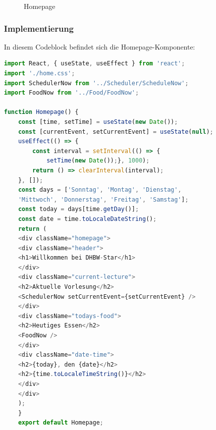 \begin{figure}[htbp]
	\centering
	\caption{Homepage}
\end{figure}
\newpage
\subsubsection{Implementierung}
In diesem Codeblock befindet sich die Homepage-Komponente:
\begin{lstlisting}[language=JavaScript,
	frame=single,           % Ein Rahmen um den Code
	framexleftmargin=15pt,  % Rahmen link von den Zahlen
	style=algoBericht,
	label={Homepage-Komponente},
	captionpos=b ,          % Caption unter den Code setzen
	caption={Homepage-Komponente}]
import React, { useState, useEffect } from 'react';
import './home.css';
import SchedulerNow from '../Scheduler/ScheduleNow';
import FoodNow from '../Food/FoodNow';

function Homepage() {
	const [time, setTime] = useState(new Date());
	const [currentEvent, setCurrentEvent] = useState(null);
	useEffect(() => {
		const interval = setInterval(() => {
			setTime(new Date());}, 1000);
		return () => clearInterval(interval);
	}, []);
	const days = ['Sonntag', 'Montag', 'Dienstag', 
	'Mittwoch', 'Donnerstag', 'Freitag', 'Samstag'];
	const today = days[time.getDay()];
	const date = time.toLocaleDateString();
	return (
	<div className="homepage">
	<div className="header">
	<h1>Willkommen bei DHBW-Star</h1>
	</div>
	<div className="current-lecture">
	<h2>Aktuelle Vorlesung</h2>
	<SchedulerNow setCurrentEvent={setCurrentEvent} />
	</div>
	<div className="todays-food">
	<h2>Heutiges Essen</h2>
	<FoodNow />
	</div>
	<div className="date-time">
	<h2>{today}, den {date}</h2>
	<h2>{time.toLocaleTimeString()}</h2>
	</div>
	</div>
	);
	}
	export default Homepage;
	
\end{lstlisting}

